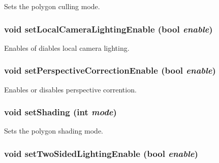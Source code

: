Sets the polygon culling mode. \hypertarget{classm3g_1_1PolygonMode_232d4cff53e6fc4863e144dc61e9465c}{
\subsubsection[{setLocalCameraLightingEnable}]{\setlength{\rightskip}{0pt plus 5cm}void setLocalCameraLightingEnable (bool {\em enable})}}
\label{classm3g_1_1PolygonMode_232d4cff53e6fc4863e144dc61e9465c}


Enables of diables local camera lighting. \hypertarget{classm3g_1_1PolygonMode_81003e409298c3247ab2fed98a7270e9}{
\subsubsection[{setPerspectiveCorrectionEnable}]{\setlength{\rightskip}{0pt plus 5cm}void setPerspectiveCorrectionEnable (bool {\em enable})}}
\label{classm3g_1_1PolygonMode_81003e409298c3247ab2fed98a7270e9}


Enables or disables perspective corrention. \hypertarget{classm3g_1_1PolygonMode_ebd2bc289af0e5cbee5ea29cbc55ba5a}{
\subsubsection[{setShading}]{\setlength{\rightskip}{0pt plus 5cm}void setShading (int {\em mode})}}
\label{classm3g_1_1PolygonMode_ebd2bc289af0e5cbee5ea29cbc55ba5a}


Sets the polygon shading mode. \hypertarget{classm3g_1_1PolygonMode_8687b0d3016a777d32e7ebfa1ffd45aa}{
\subsubsection[{setTwoSidedLightingEnable}]{\setlength{\rightskip}{0pt plus 5cm}void setTwoSidedLightingEnable (bool {\em enable})}}
\label{classm3g_1_1PolygonMode_8687b0d3016a777d32e7ebfa1ffd45aa}


